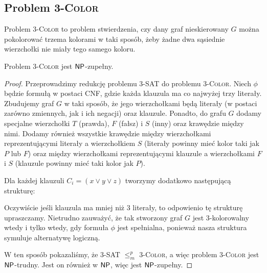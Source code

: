 \subsection{Problem 3-\textsc{Color}}

Problem 3-\textsc{Color} to problem stwierdzenia, czy dany graf nieskierowany $G$ można pokolorować trzema kolorami w taki sposób, żeby żadne dwa sąsiednie wierzchołki nie miały tego samego koloru.

\begin{theorem}
    Problem 3-\textsc{Color} jest $\textsf{NP}$-zupełny.
\end{theorem}
\begin{proof}
    Przeprowadzimy redukcję problemu 3-SAT do problemu 3-\textsc{Color}. Niech $\phi$ będzie formułą w postaci CNF, gdzie każda klauzula ma co najwyżej trzy literały. Zbudujemy graf $G$ w taki sposób, że jego wierzchołkami będą literały (w postaci zarówno zmiennych, jak i ich negacji) oraz klauzule.
    Ponadto, do grafu $G$ dodamy specjalne wierzchołki $T$ (prawda), $F$ (fałsz) i $S$ (inny) oraz krawędzie między nimi. Dodamy również wszystkie krawędzie między wierzchołkami reprezentującymi literały a wierzchołkiem $S$ (literały powinny mieć kolor taki jak $P$ lub $F$) oraz między wierzchołkami reprezentującymi klauzule a wierzchołkami $F$ i $S$ (klauzule powinny mieć taki kolor jak $P$).

    Dla każdej klauzuli $C_i = (x \lor y \lor z)$ tworzymy dodatkowo następującą strukturę:
    \begin{figure}[H]
        \centering
    \end{figure}

    Oczywiście jeśli klauzula ma mniej niż $3$ literały, to odpowienio tę strukturę upraszczamy.
    Nietrudno zauważyć, że tak stworzony graf $G$ jest 3-kolorowalny wtedy i tylko wtedy, gdy formuła $\phi$ jest spełnialna, ponieważ nasza struktura symuluje alternatywę logiczną.

    W ten sposób pokazaliśmy, że 3-SAT $\leq_m^p$ 3-\textsc{Color}, a więc problem 3-\textsc{Color} jest $\textsf{NP}$-trudny. Jest on również w $\textsf{NP}$, więc jest $\textsf{NP}$-zupełny.
\end{proof}

